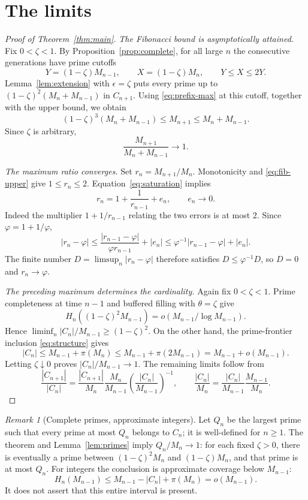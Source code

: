 \documentclass[11pt,letterpaper]{article}
\numberwithin{equation}{section}
\theoremstyle{definition}
\theoremstyle{remark}
\newtheorem{remark}[theorem]{Remark}
\newcommand{\ph}{\varphi}
\begin{document}
\section{The limits}
\label{sec:limits}

\begin{proof}[Proof of Theorem~\ref{thm:main}]
\emph{The Fibonacci bound is asymptotically attained.}
Fix $0<\zeta<1$. By Proposition~\ref{prop:complete}, for all large $n$
the consecutive generations have prime cutoffs
\[
 Y=(1-\zeta)M_{n-1},\qquad X=(1-\zeta)M_n,
 \qquad Y\le X\le2Y.
\]
Lemma~\ref{lem:extension} with $\epsilon=\zeta$ puts every prime up to
$(1-\zeta)^2(M_n+M_{n-1})$ in $C_{n+1}$.
Using \eqref{eq:prefix-max} at this cutoff, together with the upper bound,
we obtain
\[
 (1-\zeta)^3(M_n+M_{n-1})\le M_{n+1}\le M_n+M_{n-1}.
\]
Since $\zeta$ is arbitrary,
\begin{equation}\label{eq:saturation}
 \frac{M_{n+1}}{M_n+M_{n-1}}\longrightarrow1.
\end{equation}

\emph{The maximum ratio converges.}
Set $r_n=M_{n+1}/M_n$. Monotonicity and \eqref{eq:fib-upper} give
$1\le r_n\le2$. Equation~\eqref{eq:saturation} implies
\[
 r_n=1+\frac1{r_{n-1}}+e_n,\qquad e_n\longrightarrow0.
\]
Indeed the multiplier $1+1/r_{n-1}$ relating the two errors is at most $2$.
Since $\ph=1+1/\ph$,
\[
 |r_n-\ph|\le\frac{|r_{n-1}-\ph|}{\ph r_{n-1}}+|e_n|
 \le\ph^{-1}|r_{n-1}-\ph|+|e_n|.
\]
The finite number $D=\limsup_n|r_n-\ph|$ therefore satisfies
$D\le\ph^{-1}D$, so $D=0$ and $r_n\to\ph$.

\emph{The preceding maximum determines the cardinality.}
Again fix $0<\zeta<1$. Prime completeness at time $n-1$ and buffered
filling with $\theta=\zeta$ give
\[
 H_n((1-\zeta)^2M_{n-1})=o(M_{n-1}/\log M_{n-1}).
\]
Hence $\liminf_n|C_n|/M_{n-1}\ge(1-\zeta)^2$.
On the other hand, the prime-frontier inclusion \eqref{eq:structure} gives
\[
 |C_n|\le M_{n-1}+\pi(M_n)
 \le M_{n-1}+\pi(2M_{n-1})=M_{n-1}+o(M_{n-1}).
\]
Letting $\zeta\downarrow0$ proves $|C_n|/M_{n-1}\to1$.
The remaining limits follow from
\[
 \frac{|C_{n+1}|}{|C_n|}
 =\frac{|C_{n+1}|}{M_n}\frac{M_n}{M_{n-1}}
       \left(\frac{|C_n|}{M_{n-1}}\right)^{-1},\qquad
 \frac{|C_n|}{M_n}=\frac{|C_n|}{M_{n-1}}\frac{M_{n-1}}{M_n}.
\]
\end{proof}

\begin{remark}[Complete primes, approximate integers]
Let $Q_n$ be the largest prime such that every prime at most $Q_n$ belongs
to $C_n$; it is well-defined for $n\ge1$. The theorem and
Lemma~\ref{lem:primes} imply $Q_n/M_n\to1$: for each fixed $\zeta>0$,
there is eventually a prime between $(1-\zeta)^2M_n$ and
$(1-\zeta)M_n$, and that prime is at most $Q_n$.
For integers the conclusion is approximate coverage below $M_{n-1}$:
\[
 H_n(M_{n-1})\le M_{n-1}-|C_n|+\pi(M_n)=o(M_{n-1}).
\]
It does not assert that this entire interval is present.
\end{remark}
\end{document}
